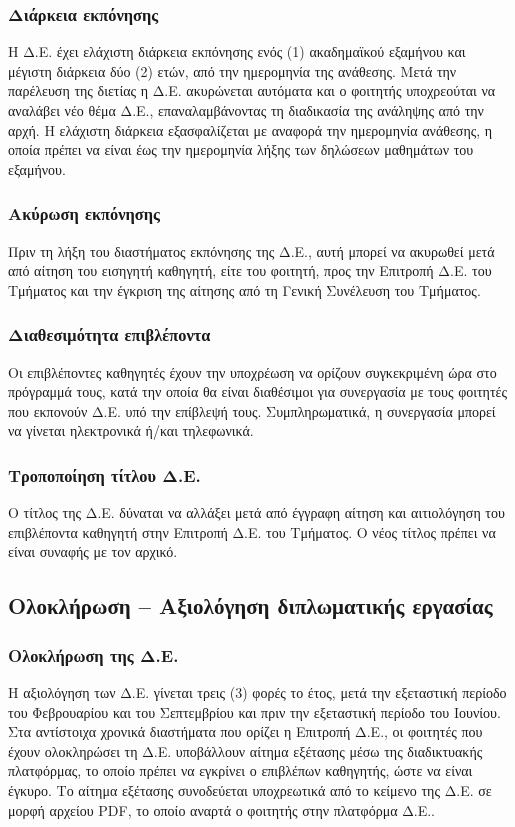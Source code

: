 \documentclass[twoside, a4paper, 11pt]{article}
\begin{document}
\subsubsection{Διάρκεια εκπόνησης } \label{subsubsection:effectiveness}

Η Δ.Ε. έχει ελάχιστη διάρκεια εκπόνησης ενός (1) ακαδημαϊκού εξαμήνου και μέγιστη διάρκεια δύο (2) ετών, από την ημερομηνία της ανάθεσης. Μετά την παρέλευση της διετίας η Δ.Ε. ακυρώνεται αυτόματα και ο φοιτητής υποχρεούται να αναλάβει νέο θέμα Δ.Ε., επαναλαμβάνοντας τη διαδικασία της ανάληψης από την αρχή. Η ελάχιστη διάρκεια εξασφαλίζεται με αναφορά την ημερομηνία ανάθεσης, η οποία πρέπει να είναι έως την ημερομηνία λήξης των δηλώσεων μαθημάτων του εξαμήνου. 

\subsubsection{Ακύρωση εκπόνησης }
Πριν τη λήξη του διαστήματος εκπόνησης της Δ.Ε., αυτή μπορεί να ακυρωθεί μετά από αίτηση του εισηγητή καθηγητή, είτε του φοιτητή, προς την Επιτροπή Δ.Ε. του Τμήματος και την έγκριση της αίτησης από τη Γενική Συνέλευση του Τμήματος. 

\subsubsection{Διαθεσιμότητα επιβλέποντα}
Οι επιβλέποντες καθηγητές έχουν την υποχρέωση να ορίζουν συγκεκριμένη ώρα στο πρόγραμμά τους, κατά την οποία θα είναι διαθέσιμοι για συνεργασία με τους φοιτητές που εκπονούν Δ.Ε. υπό την επίβλεψή τους. Συμπληρωματικά, η συνεργασία μπορεί να γίνεται ηλεκτρονικά ή/και τηλεφωνικά.

\subsubsection{Τροποποίηση τίτλου Δ.Ε. }
Ο τίτλος της Δ.Ε. δύναται να αλλάξει μετά από έγγραφη αίτηση και αιτιολόγηση του επιβλέποντα καθηγητή στην Επιτροπή Δ.Ε. του Τμήματος. Ο νέος τίτλος πρέπει να είναι συναφής με τον αρχικό. 

\subsection{Ολοκλήρωση – Αξιολόγηση διπλωματικής εργασίας } \label{subsection:drts}

\subsubsection{Ολοκλήρωση της Δ.Ε. }
Η αξιολόγηση των Δ.Ε. γίνεται τρεις (3) φορές το έτος, μετά την εξεταστική περίοδο του Φεβρουαρίου και του Σεπτεμβρίου και πριν την εξεταστική περίοδο του Ιουνίου. Στα αντίστοιχα χρονικά διαστήματα που ορίζει η Επιτροπή Δ.Ε., οι φοιτητές που έχουν ολοκληρώσει τη Δ.Ε. υποβάλλουν αίτημα εξέτασης μέσω της διαδικτυακής πλατφόρμας, το οποίο πρέπει να εγκρίνει ο επιβλέπων καθηγητής, ώστε να είναι έγκυρο. Το αίτημα εξέτασης συνοδεύεται υποχρεωτικά από το κείμενο της Δ.Ε. σε μορφή αρχείου PDF, το οποίο αναρτά ο φοιτητής στην πλατφόρμα Δ.Ε..
\end{document}
